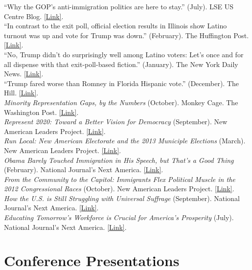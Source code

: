 \documentclass[11pt, a4paper]{article}
\newcommand{\years}[1]{\marginnote{\scriptsize #1}}
\begin{document}
\years{} ``Why the GOP’s anti-immigration politics are here to stay.'' (July). LSE US Centre Blog. \href{http://blogs.lse.ac.uk/usappblog/2018/07/09/why-the-gops-anti-immigration-politics-are-here-to-stay/}{[Link]}.\\
\years{2017} ``In contrast to the exit poll, official election results in Illinois show Latino turnout was up and vote for Trump was down.'' (February). The Huffington Post. \href{http://huff.to/2lC9rc8}{[Link]}.\\
\years{} ``No, Trump didn't do surprisingly well among Latino voters: Let's once and for all dispense with that exit-poll-based fiction.'' (January). The New York Daily News. \href{http://nydn.us/2jtowIr}{[Link]}.\\
\years{2016} ``Trump fared worse than Romney in Florida Hispanic vote.'' (December). The Hill. \href{http://bit.ly/2gNFKOz}{[Link]}.\\
\years{2014}\textit{Minority Representation Gaps, by the Numbers} (October). Monkey Cage. The Washington Post. \href{http://wapo.st/ZGQntG}{[Link]}.\\
\years{}\textit{Represent 2020: Toward a Better Vision for Democracy} (September). New American Leaders Project. \href{http://bit.ly/1tLsVcV}{[Link]}.\\
\years{2013}\textit{Run Local: New American Electorate and the 2013 Municiple Elections} (March). New American Leaders Project. \href{http://bit.ly/WKwtGR}{[Link]}.\\
\years{}\textit{Obama Barely Touched Immigration in His Speech, but That's a Good Thing} (February). National Journal's Next America. \href{http://bit.ly/12R7lVG}{[Link]}.\\
\years{2012}\textit{From the Community to the Capitol: Immigrants Flex Political Muscle in the 2012 Congressional Races} (October). New American Leaders Project. \href{http://bit.ly/RLVzVF}{[Link]}.\\
\years{}\textit{How the U.S. is Still Struggling with Universal Suffrage} (September). National Journal's Next America.  \href{http://bit.ly/UDAUpD}{[Link]}.\\
\years{}\textit{Educating Tomorrow's Workforce is Crucial for America's Prosperity} (July). National Journal's Next America. \href{http://bit.ly/NCHoyf}{[Link]}.\\

\section*{Conference Presentations}
\end{document}
